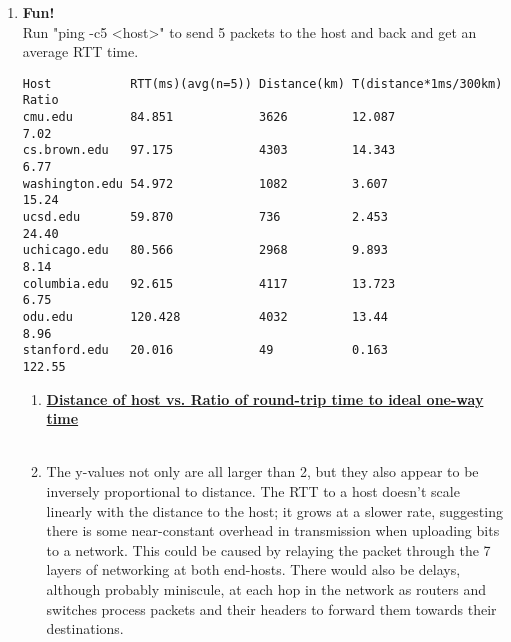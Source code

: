 \documentclass[11pt,fleqn]{article}
\begin{document}
\begin{enumerate}[1)]
\newpage
\item \textbf{Fun!} \\ Run "ping -c5 <host>" to send 5 packets to the host and back and get an average RTT time.
\begin{verbatim}
Host           RTT(ms)(avg(n=5)) Distance(km) T(distance*1ms/300km) Ratio
cmu.edu        84.851            3626         12.087                7.02
cs.brown.edu   97.175            4303         14.343                6.77
washington.edu 54.972            1082         3.607                 15.24
ucsd.edu       59.870            736          2.453                 24.40
uchicago.edu   80.566            2968         9.893                 8.14
columbia.edu   92.615            4117         13.723                6.75
odu.edu        120.428           4032         13.44                 8.96
stanford.edu   20.016            49           0.163                 122.55
\end{verbatim}
\begin{enumerate}[1.]
\item {\bf\underline{Distance of host vs. Ratio of round-trip time to ideal one-way time}} \\\\ 
\item The y-values not only are all larger than 2, but they also appear to be inversely proportional to distance. The RTT to a host doesn't scale linearly with the distance to the host; it grows at a slower rate, suggesting there is some near-constant overhead in transmission when uploading bits to a network. This could be caused by relaying the packet through the 7 layers of networking at both end-hosts. There would also be delays, although probably miniscule, at each hop in the network as routers and switches process packets and their headers to forward them towards their destinations.
\end{enumerate}

\end{enumerate}
\end{document}
